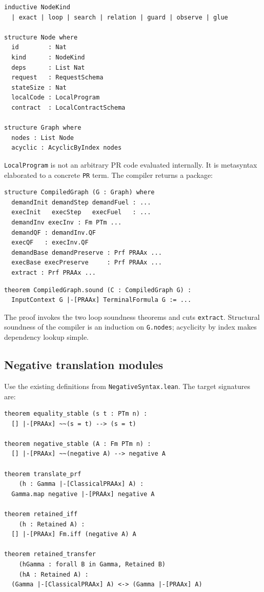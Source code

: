 \begin{lstlisting}[language={}]
inductive NodeKind
  | exact | loop | search | relation | guard | observe | glue

structure Node where
  id        : Nat
  kind      : NodeKind
  deps      : List Nat
  request   : RequestSchema
  stateSize : Nat
  localCode : LocalProgram
  contract  : LocalContractSchema

structure Graph where
  nodes : List Node
  acyclic : AcyclicByIndex nodes
\end{lstlisting}

\texttt{LocalProgram} is not an arbitrary PR code evaluated internally.  It is metasyntax elaborated to a concrete \texttt{PR} term.  The compiler returns a package:

\begin{lstlisting}[language={}]
structure CompiledGraph (G : Graph) where
  demandInit demandStep demandFuel : ...
  execInit   execStep   execFuel   : ...
  demandInv execInv : Fm PTm ...
  demandQF : demandInv.QF
  execQF   : execInv.QF
  demandBase demandPreserve : Prf PRAAx ...
  execBase execPreserve     : Prf PRAAx ...
  extract : Prf PRAAx ...
\end{lstlisting}

\begin{lstlisting}[language={}]
theorem CompiledGraph.sound (C : CompiledGraph G) :
  InputContext G |-[PRAAx] TerminalFormula G := ...
\end{lstlisting}

The proof invokes the two loop soundness theorems and cuts \texttt{extract}.  Structural soundness of the compiler is an induction on \texttt{G.nodes}; acyclicity by index makes dependency lookup simple.

\subsection{Negative translation modules}

Use the existing definitions from \texttt{NegativeSyntax.lean}.  The target signatures are:

\begin{lstlisting}[language={}]
theorem equality_stable (s t : PTm n) :
  [] |-[PRAAx] ~~(s = t) --> (s = t)

theorem negative_stable (A : Fm PTm n) :
  [] |-[PRAAx] ~~(negative A) --> negative A

theorem translate_prf
    (h : Gamma |-[ClassicalPRAAx] A) :
  Gamma.map negative |-[PRAAx] negative A

theorem retained_iff
    (h : Retained A) :
  [] |-[PRAAx] Fm.iff (negative A) A

theorem retained_transfer
    (hGamma : forall B in Gamma, Retained B)
    (hA : Retained A) :
  (Gamma |-[ClassicalPRAAx] A) <-> (Gamma |-[PRAAx] A)
\end{lstlisting}

